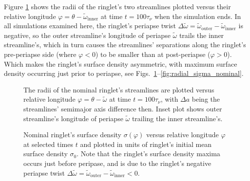 \documentclass[preprint]{aastex62}
\begin{document}
Figure \ref{fig:nominal_streamlines} shows the radii of the ringlet's two streamlines plotted
versus their relative longitude $\varphi=\theta-\tilde{\omega}_{\text{inner}}$ at time $t=100\tau_\nu$
when the simulation ends. In all simulations examined here, the ringlet's periapse twist 
$\Delta\tilde{\omega} = \tilde{\omega}_{\text{outer}} - \tilde{\omega}_{\text{inner}}$ is negative,
so the outer streamline's longitude of periapse $\tilde{\omega}$ trails
the inner streamline's, which in turn causes the streamlines' separations along
the ringlet's pre-periapse side (where $\varphi < 0$) to be smaller than at post-periapse ($\varphi>0$).
Which makes the ringlet's surface density asymmetric, with maximum surface density
occurring just prior to periapse, see Figs.\ \ref{fig:nominal_streamlines}--\ref{fig:radial_sigma_nominal}.

\begin{figure}
    \caption{
        \label{fig:nominal_streamlines}
        The radii of the nominal ringlet's streamlines are plotted versus relative longitude
        $\varphi=\theta-\tilde{\omega}$ at time $t=100\tau_\nu$, with $\Delta a$ being the streamlines'
        semimajor axis difference then. Inset plot
        shows outer streamline's longitude of periapse $\tilde{\omega}$ trailing
        the inner streamline's.
    }
\end{figure}

\begin{figure}
    \caption{
        \label{fig:nominal_sigma_vs_longitude}
        Nominal ringlet's surface density $\sigma(\varphi)$ versus relative
        longitude $\varphi$ at selected times $t$ and plotted in units of ringlet's initial
        mean surface density $\sigma_0$. Note that the ringlet's surface
        density maxima occurs just before peripase,  and is due to the ringlet's
        negative periapse twist 
        $\Delta\tilde{\omega} = \tilde{\omega}_{\text{outer}} - \tilde{\omega}_{\text{inner}} < 0$.
    }
\end{figure}
\end{document}
